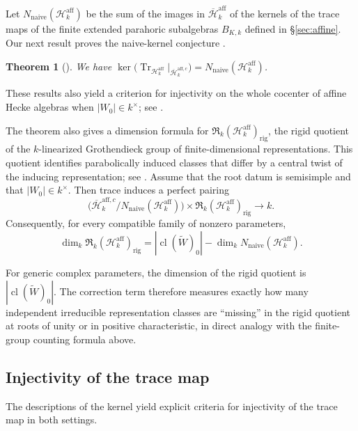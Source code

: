 \documentclass[11pt,letterpaper]{amsart}
\newtheorem{theoremintro}{Theorem}
\theoremstyle{definition}
\numberwithin{equation}{section}
\numberwithin{theorem}{section}
\newcommand{\kk}{k}
\newcommand{\cH}{\mathcal H}
\newcommand{\bH}{\overline{\mathcal H}}
\newcommand{\cR}{\mathfrak R}
\newcommand{\Wt}{\tilde W}
\newcommand{\rig}{\mathrm{rig}}
\newcommand{\naive}{\mathrm{naive}}
\DeclareMathOperator{\Tr}{Tr}
\begin{document}
Let $N_{\naive}(\cH_\kk^{\mathrm{aff}})$ be the sum of
the images in $\bH_\kk^{\mathrm{aff}}$ of the kernels
of the trace maps of the finite extended parahoric
subalgebras $B_{K,\kk}$ defined in \S\ref{sec:affine}.
Our next result proves the naive-kernel conjecture \cite[Conjecture~3.13]{He16}.

\begin{theoremintro}[{}]
\label{thm:intro-affine}
We have $\ker\bigl(
   \Tr_{\cH_\kk^{\mathrm{aff}}}
   |_{\bH_\kk^{\mathrm{aff},c}}
 \bigr)
   =N_{\naive}(\cH_\kk^{\mathrm{aff}})$.
\end{theoremintro}

These results also yield a criterion for injectivity on the whole cocenter of affine Hecke algebras when $|W_0|\in\kk^\times$; see .

The theorem also gives a dimension formula for $\cR_\kk(\cH_\kk^{\mathrm{aff}})_{\rig}$, the rigid quotient of the $\kk$-linearized Grothendieck group of finite-dimensional representations.
This quotient identifies parabolically induced classes
that differ by a central twist of the inducing representation;
see \cite[Definition~6.1]{CH}.
Assume that the root datum is semisimple and that
$|W_0|\in\kk^\times$. Then trace induces a perfect pairing
\[
 \bigl(
   \bH_\kk^{\mathrm{aff},c}/
   N_{\naive}(\cH_\kk^{\mathrm{aff}})
 \bigr)
 \times
 \cR_\kk(\cH_\kk^{\mathrm{aff}})_{\rig}
 \longrightarrow\kk.
\]
Consequently, for every compatible family of nonzero
parameters,
\[
 \dim_\kk\cR_\kk(\cH_\kk^{\mathrm{aff}})_{\rig}
   =|\operatorname{cl}(\Wt)_0|
      -\dim_\kk N_{\naive}(\cH_\kk^{\mathrm{aff}}).
\]

For generic complex parameters, the dimension of the rigid
quotient is $|\operatorname{cl}(\Wt)_0|$.
The correction term therefore measures exactly how many
independent irreducible representation classes are
``missing'' in the rigid quotient at roots of unity or
in positive characteristic, in direct analogy with the finite-group counting formula above.

\subsection{Injectivity of the trace map}

The descriptions of the kernel yield explicit criteria for injectivity of the trace map in both settings. 
\end{document}

